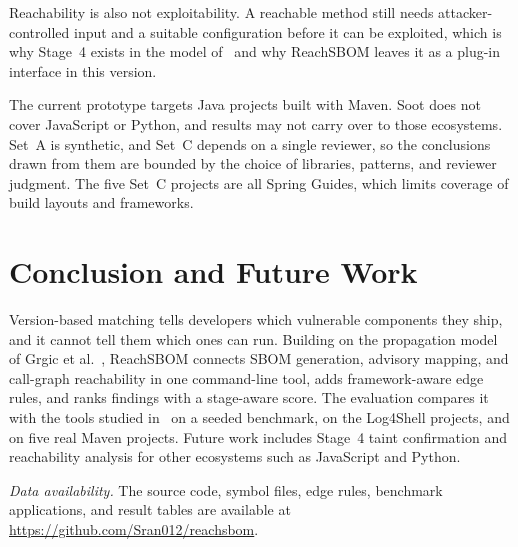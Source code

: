 \documentclass[conference]{IEEEtran}
\begin{document}
Reachability is also not exploitability. A reachable method still needs attacker-controlled input and a suitable configuration before it can be exploited, which is why Stage~4 exists in the model of~\cite{grgic} and why ReachSBOM leaves it as a plug-in interface in this version.

The current prototype targets Java projects built with Maven. Soot does not cover JavaScript or Python, and results may not carry over to those ecosystems. Set~A is synthetic, and Set~C depends on a single reviewer, so the conclusions drawn from them are bounded by the choice of libraries, patterns, and reviewer judgment. The five Set~C projects are all Spring Guides, which limits coverage of build layouts and frameworks.

\section{Conclusion and Future Work}\label{sec:conclusion}
Version-based matching tells developers which vulnerable components they ship, and it cannot tell them which ones can run. Building on the propagation model of Grgic et al.~\cite{grgic}, ReachSBOM connects SBOM generation, advisory mapping, and call-graph reachability in one command-line tool, adds framework-aware edge rules, and ranks findings with a stage-aware score. The evaluation compares it with the tools studied in~\cite{grgic} on a seeded benchmark, on the Log4Shell projects, and on five real Maven projects. Future work includes Stage~4 taint confirmation and reachability analysis for other ecosystems such as JavaScript and Python.

\emph{Data availability.} The source code, symbol files, edge rules, benchmark applications, and result tables are available at \url{https://github.com/Sran012/reachsbom}.
\end{document}
